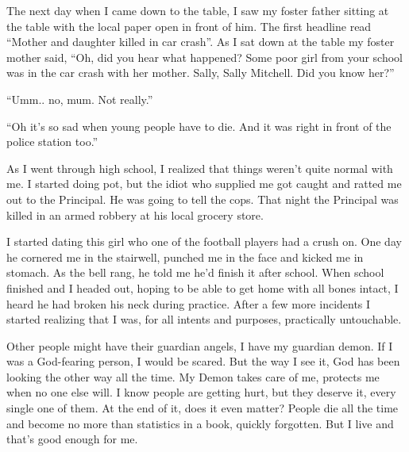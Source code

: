 \documentclass[12pt,letterpaper]{article}
\begin{document}
The next day when I came down to the table, I saw my foster father sitting at the table with the local paper open in front of him. The first headline read ``Mother and daughter killed in car crash''. As I sat down at the table my foster mother said, ``Oh, did you hear what happened? Some poor girl from your school was in the car crash with her mother. Sally, Sally Mitchell. Did you know her?''

``Umm.. no, mum. Not really.''

``Oh it's so sad when young people have to die. And it was right in front of the police station too.''

\vspace{1in}

As I went through high school, I realized that things weren't quite normal with me. I started doing pot, but the idiot who supplied me got caught and ratted me out to the Principal. He was going to tell the cops. That night the Principal was killed in an armed robbery at his local grocery store. 

I started dating this girl who one of the football players had a crush on. One day he cornered me in the stairwell, punched me in the face and kicked me in stomach. As the bell rang, he told me he'd finish it after school. When school finished and I headed out, hoping to be able to get home with all bones intact, I heard he had broken his neck during practice. After a few more incidents I started realizing that I was, for all intents and purposes, practically untouchable.


Other people might have their guardian angels, I have my guardian demon. If I was a God-fearing person, I would be scared. But the way I see it, God has been looking the other way all the time. My Demon takes care of me, protects me when no one else will. I know people are getting hurt, but they deserve it, every single one of them. At the end of it, does it even matter? People die all the time and become no more than statistics in a book, quickly forgotten. But I live and that's good enough for me.

\end{document}
